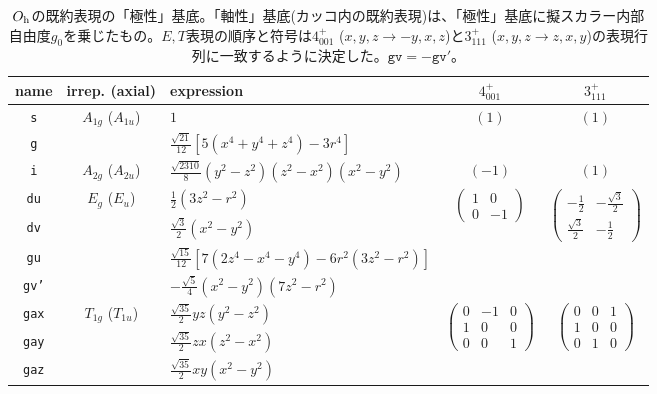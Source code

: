\documentclass[11pt]{easymemo}
\begin{document}
\begin{table}[ht!]
\small
\begin{center}
\caption{$O_{\rm h}$の既約表現の「極性」基底。「軸性」基底(カッコ内の既約表現)は、「極性」基底に擬スカラー内部自由度$g_{0}$を乗じたもの。$E,T$表現の順序と符号は$4_{001}^{+}$ ($x,y,z\to -y,x,z$)と$3_{111}^{+}$ ($x,y,z\to z,x,y$)の表現行列に一致するように決定した。$\texttt{gv}=-\texttt{gv}'$。}
\label{tbl:4}
\renewcommand{\arraystretch}{1.4}
\begin{tabular}{cclcc} \hline\hline
name & irrep. (axial) & expression & $4_{001}^{+}$ & $3_{111}^{+}$ \\ \hline
{\tt s} & $A_{1g}$ ($A_{1u}$) & $1$ & $(1)$ & $(1)$ \\
{\tt g} & & $\frac{\sqrt{21}}{12}[5(x^4+y^4+z^4)-3r^4]$ & & \\ \hline
{\tt i} & $A_{2g}$ ($A_{2u}$) & $\frac{\sqrt{2310}}{8}(y^{2}-z^{2})(z^{2}-x^{2})(x^{2}-y^{2})$ & $(-1)$ & $(1)$ \\ \hline
{\tt du} & $E_{g}$ ($E_{u}$) & $\frac{1}{2}(3z^{2}-r^{2})$ & \multirow{2}{*}{$\begin{pmatrix} 1 & 0 \\ 0 & -1 \end{pmatrix}$} & \multirow{2}{*}{$\begin{pmatrix} -\frac{1}{2} & -\frac{\sqrt{3}}{2} \\ \frac{\sqrt{3}}{2} & -\frac{1}{2} \end{pmatrix}$} \\
{\tt dv} & & $\frac{\sqrt{3}}{2}(x^{2}-y^{2})$ \\
{\tt gu} & & $\frac{\sqrt{15}}{12}[7(2z^4-x^4-y^4)-6r^2(3z^2-r^2)]$ & & \\
{\tt gv'} & & $-\frac{\sqrt{5}}{4}(x^2-y^2)(7z^2-r^2)$ & & \\ \hline
{\tt gax} & $T_{1g}$ ($T_{1u}$) & $\frac{\sqrt{35}}{2}yz(y^{2} - z^{2})$ & \multirow{3}{*}{$\begin{pmatrix}0&-1&0\\1&0&0\\0&0&1\end{pmatrix}$} & \multirow{3}{*}{$\begin{pmatrix}0&0&1\\1&0&0\\0&1&0\end{pmatrix}$} \\
{\tt gay} & & $\frac{\sqrt{35}}{2}zx(z^{2}-x^{2})$ \\
{\tt gaz} & & $\frac{\sqrt{35}}{2}xy(x^{2}-y^{2})$ \\ \hline

\end{tabular}
\end{center}
\end{table}
\end{document}
